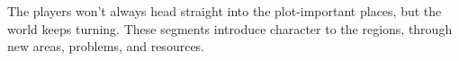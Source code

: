 \noindent
The players won't always head straight into the plot-important places, but the world keeps turning.
These \glspl{segment} introduce character to the \glspl{region}, through new areas, problems, and resources.
